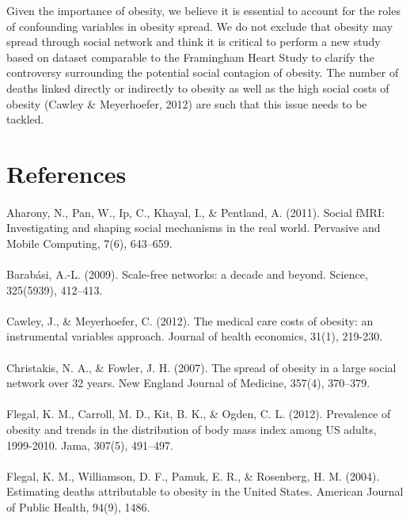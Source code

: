 \documentclass[11pt]{article}
\begin{document}
Given the importance of obesity, we believe it is essential to account for the roles of confounding variables in obesity spread. We do not exclude that obesity may spread through social network and think it is critical to perform a new study based on dataset comparable to the Framingham Heart Study to clarify the controversy surrounding the potential social contagion of obesity. The number of deaths linked directly or indirectly to obesity as well as the high social costs of obesity (Cawley \& Meyerhoefer, 2012) are such that this issue needs to be tackled.

\newpage
\section{References}
\paragraph{}
Aharony, N., Pan, W., Ip, C., Khayal, I., \& Pentland, A. (2011). Social fMRI: Investigating and shaping social mechanisms in the real world. Pervasive and Mobile Computing, 7(6), 643–659.
\paragraph{}
Barabási, A.-L. (2009). Scale-free networks: a decade and beyond. Science, 325(5939), 412–413.
\paragraph{}
Cawley, J., \& Meyerhoefer, C. (2012). The medical care costs of obesity: an instrumental variables approach. Journal of health economics, 31(1), 219-230.
\paragraph{}
Christakis, N. A., \& Fowler, J. H. (2007). The spread of obesity in a large social network over 32 years. New England Journal of Medicine, 357(4), 370–379.
\paragraph{}
Flegal, K. M., Carroll, M. D., Kit, B. K., \& Ogden, C. L. (2012). Prevalence of obesity and trends in the distribution of body mass index among US adults, 1999-2010. Jama, 307(5), 491–497.
\paragraph{}
Flegal, K. M., Williamson, D. F., Pamuk, E. R., \& Rosenberg, H. M. (2004). Estimating deaths attributable to obesity in the United States. American Journal of Public Health, 94(9), 1486.
\end{document}
